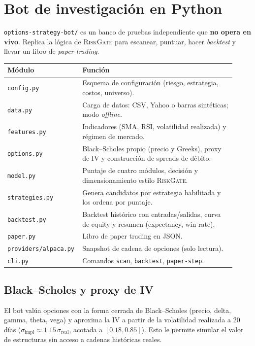 \documentclass[11pt,letterpaper]{article}
\newcommand{\RiskGate}{\textsc{RiskGate}}
\begin{document}
\section{Bot de investigación en Python}

\texttt{options-strategy-bot/} es un banco de pruebas independiente que
\textbf{no opera en vivo}. Replica la lógica de \RiskGate{} para escanear,
puntuar, hacer \emph{backtest} y llevar un libro de \emph{paper trading}.

\begin{longtable}{p{0.26\linewidth} p{0.66\linewidth}}
\toprule
\textbf{Módulo} & \textbf{Función} \\
\midrule
\texttt{config.py} & Esquema de configuración (riesgo, estrategia, costos, universo). \\
\texttt{data.py} & Carga de datos: CSV, Yahoo o barras sintéticas; modo \emph{offline}. \\
\texttt{features.py} & Indicadores (SMA, RSI, volatilidad realizada) y régimen de mercado. \\
\texttt{options.py} & Black--Scholes propio (precio y Greeks), proxy de IV y construcción de spreads de débito. \\
\texttt{model.py} & Puntaje de cuatro módulos, decisión y dimensionamiento estilo \RiskGate{}. \\
\texttt{strategies.py} & Genera candidatos por estrategia habilitada y los ordena por puntaje. \\
\texttt{backtest.py} & Backtest histórico con entradas/salidas, curva de equity y resumen (expectancy, win rate). \\
\texttt{paper.py} & Libro de paper trading en JSON. \\
\texttt{providers/alpaca.py} & Snapshot de cadena de opciones (solo lectura). \\
\texttt{cli.py} & Comandos \texttt{scan}, \texttt{backtest}, \texttt{paper-step}. \\
\bottomrule
\end{longtable}

\subsection{Black--Scholes y proxy de IV}
El bot valúa opciones con la forma cerrada de Black--Scholes (precio, delta,
gamma, theta, vega) y aproxima la IV a partir de la volatilidad realizada a 20
días ($\sigma_{\text{impl}}\approx 1.15\,\sigma_{\text{real}}$, acotada a
$[0.18, 0.85]$). Esto le permite simular el valor de estructuras sin acceso a
cadenas históricas reales.
\end{document}
